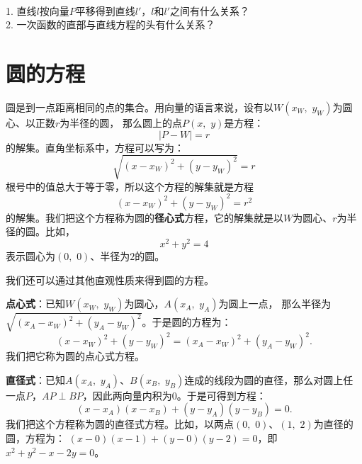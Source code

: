 \documentclass[12pt,UTF8]{ctexbook}
\begin{document}
\begin{sk}
    \mbox{}\\
    1. 直线$l$按向量$P$平移得到直线$l'$，$l$和$l'$之间有什么关系？ \\
    2. 一次函数的直部与直线方程的头有什么关系？
\end{sk}

\section{圆的方程}

圆是到一点距离相同的点的集合。用向量的语言来说，设有以$W(x_W,\,\, y_W)$为圆心、以正数$r$为半径的圆，
那么圆上的点$P(x, \,\,y)$是方程：
$$|P - W| = r$$
的解集。直角坐标系中，方程可以写为：
$$\sqrt{(x - x_W)^2 + (y - y_W)^2} = r$$
根号中的值总大于等于零，所以这个方程的解集就是方程
$$(x - x_W)^2 + (y - y_W)^2 = r^2$$
的解集。我们把这个方程称为圆的\textbf{径心式}方程，它的解集就是以$W$为圆心、$r$为半径的圆。比如，
$$x^2 + y^2 = 4$$
表示圆心为$(0,\,\,0)$、半径为$2$的圆。

我们还可以通过其他直观性质来得到圆的方程。

\textbf{点心式}：已知$W(x_W,\,\, y_W)$为圆心，$A(x_A,\,\,y_A)$为圆上一点，
那么半径为$\sqrt{(x_A - x_W)^2 + (y_A - y_W)^2}$。于是圆的方程为：
$$ (x - x_W)^2 + (y - y_W)^2 = (x_A - x_W)^2 + (y_A - y_W)^2.$$
我们把它称为圆的点心式方程。

\textbf{直径式}：已知$A(x_A,\,\,y_A)$、$B(x_B,\,\,y_B)$连成的线段为圆的直径，那么对圆上任一点$P$，$AP\perp BP$，因此两向量内积为$0$。于是可得到方程：
$$ (x - x_A)(x - x_B) + (y - y_A)(y - y_B) = 0.$$
我们把这个方程称为圆的直径式方程。比如，以两点$(0,\,\,0)$、$(1,\,\,2)$为直径的圆，方程为：
$ (x - 0)(x - 1) + (y - 0)(y - 2) = 0$，即$x^2 + y^2 - x - 2y = 0$。
\end{document}
